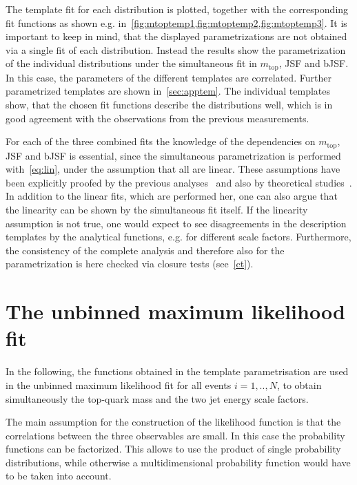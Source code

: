  The template fit for each distribution is plotted, together with the corresponding fit functions as shown e.g. in~\cref{fig:mtoptemp1,fig:mtoptemp2,fig:mtoptemp3}. It is important to keep in mind, that the displayed parametrizations are not obtained via a single fit of each distribution. Instead the results show the parametrization of the individual distributions under the simultaneous fit in $m_{\text{top}}$, JSF and bJSF. In this case, the parameters of the different templates are correlated. Further parametrized templates are shown in~\cref{sec:apptem}. The individual templates show, that the chosen fit functions describe the distributions well, which is in good agreement with the observations from the previous measurements.

For each of the three combined fits the knowledge of the dependencies on $m_{\text{top}}$, JSF and bJSF is essential, since the simultaneous parametrization is performed with~\cref{eq:lin}, under the assumption that all  are linear. 
These assumptions have been explicitly proofed by the previous analyses~\cite{Aad:2015nba,ATLAS-CONF-2017-071}  and also by theoretical studies~\cite{Heinrich:2017bqp}. In addition to the linear fits, which are performed her, one can also argue that the linearity can be shown by the simultaneous fit itself.  If the linearity assumption is not true, one would expect to see disagreements in the description  templates by the analytical functions, e.g. for different scale factors. Furthermore, the consistency of the complete analysis and therefore also for the parametrization is here checked via closure tests (see~\cref{ct}).




 
 




\section{The unbinned maximum likelihood fit}
In the following, the functions obtained in the template parametrisation are used in the unbinned maximum likelihood fit
for all events $i = 1,..,N$, to obtain simultaneously the top-quark mass and the two jet energy scale factors. 

 The main assumption for the construction of the likelihood function is that the correlations between the three observables are small. In this case the probability  functions can be factorized. This allows to use the product of single probability distributions, while otherwise a multidimensional probability function would have to be taken into account.



